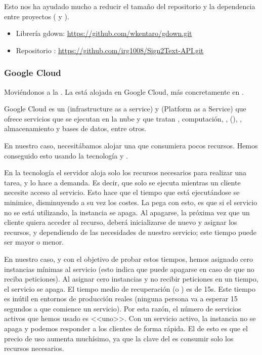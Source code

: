 Esto nos ha ayudado mucho a reducir el tamaño del repositorio y la dependencia entre proyectos ( y ).

\begin{itemize}
  \item Librería gdown: \url{https://github.com/wkentaro/gdown.git}
  \item Repositorio : \url{https://github.com/irg1008/Sign2Text-API.git}
\end{itemize}

\subsubsection{Google Cloud}

Moviéndonos a la . La  está alojada en Google Cloud, más concretamente en .

Google Cloud es un  (infrastructure as a service) y  (Platform as a Service) que ofrece servicios que se ejecutan en la nube y que tratan , computación, ,  (), , almacenamiento y bases de datos, entre otros.

En nuestro caso, necesitábamos alojar una  que consumiera pocos recursos. Hemos conseguido esto usando la tecnología  y .

En la tecnología  el servidor aloja solo los recursos necesarios para realizar una tarea, y lo hace a demanda. Es decir, que solo se ejecuta mientras un cliente necesite acceso al servicio. Esto hace que el tiempo que está ejecutándose se minimice, disminuyendo a su vez los costes. La pega con esto, es que si el servicio no se está utilizando, la instancia se apaga. Al apagarse, la próxima vez que un cliente quiera acceder al recurso, deberá inicializarse de nuevo y asignar los recursos, y dependiendo de las necesidades de nuestro servicio; este tiempo puede ser mayor o menor.

En nuestro caso, y con el objetivo de probar estos tiempos, hemos asignado cero instancias mínimas al servicio (esto indica que puede apagarse en caso de que no reciba peticiones). Al asignar cero instancias y no recibir peticiones en un tiempo, el servicio se apaga. El tiempo medio de recuperación (o ) es de 15s. Este tiempo es inútil en entornos de producción reales (ninguna persona va a esperar 15 segundos a que comience un servicio). Por esta razón, el número de servicios activos que hemos usado es <<uno>>. Con un servicio activo, la instancia no se apaga y podemos responder a los clientes de forma rápida. El  de esto es que el precio de uso aumenta muchísimo, ya que la clave del  es consumir solo los recursos necesarios.

